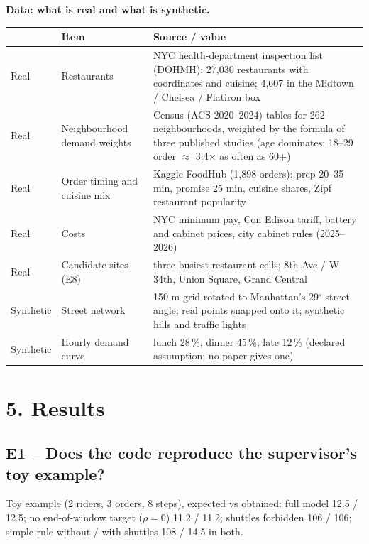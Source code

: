 \noindent\textbf{Data: what is real and what is synthetic.}
\begin{center}\small
\begin{tabular}{@{}L{1.6cm}L{3.5cm}L{9.8cm}@{}}
\toprule
 & Item & Source / value \\
\midrule
Real & Restaurants & NYC health-department inspection list (DOHMH): 27,030 restaurants with coordinates and cuisine; 4,607 in the Midtown / Chelsea / Flatiron box \\
Real & Neighbourhood demand weights & Census (ACS 2020--2024) tables for 262 neighbourhoods, weighted by the formula of three published studies (age dominates: 18--29 order $\approx$ 3.4$\times$ as often as 60+) \\
Real & Order timing and cuisine mix & Kaggle FoodHub (1,898 orders): prep 20--35 min, promise 25 min, cuisine shares, Zipf restaurant popularity \\
Real & Costs & NYC minimum pay, Con Edison tariff, battery and cabinet prices, city cabinet rules (2025--2026) \\
Real & Candidate sites (E8) & three busiest restaurant cells; 8th Ave / W 34th, Union Square, Grand Central \\
Synthetic & Street network & 150 m grid rotated to Manhattan's 29$^\circ$ street angle; real points snapped onto it; synthetic hills and traffic lights \\
Synthetic & Hourly demand curve & lunch 28\,\%, dinner 45\,\%, late 12\,\% (declared assumption; no paper gives one) \\
\bottomrule
\end{tabular}
\end{center}

\section*{5. Results}

\subsection*{E1 -- Does the code reproduce the supervisor's toy example?}
\noindent Toy example (2 riders, 3 orders, 8 steps), expected vs obtained: full model 12.5 / 12.5; no end-of-window target ($\rho = 0$) 11.2 / 11.2; shuttles forbidden 106 / 106; simple rule without / with shuttles 108 / 14.5 in both.

